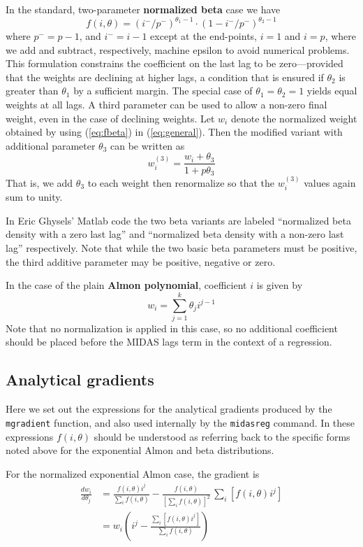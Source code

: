 \documentclass{article}
\begin{document}
In the standard, two-parameter \textbf{normalized beta} case we have
\begin{equation}
\label{eq:fbeta}
  f(i, \theta) = (i^-/p^-)^{\theta_1-1} \cdot (1-i^-/p^-)^{\theta_2-1}
\end{equation}
where $p^- = p-1$, and $i^- = i-1$ except at the end-points, $i=1$ and
$i=p$, where we add and subtract, respectively, machine epsilon to
avoid numerical problems.  This formulation constrains the coefficient
on the last lag to be zero---provided that the weights are declining
at higher lags, a condition that is ensured if $\theta_2$ is greater
than $\theta_1$ by a sufficient margin. The special case of
$\theta_1 = \theta_2 = 1$ yields equal weights at all lags. A third
parameter can be used to allow a non-zero final weight, even in the
case of declining weights.  Let $w_i$ denote the normalized weight
obtained by using (\ref{eq:fbeta}) in (\ref{eq:general}). Then the
modified variant with additional parameter $\theta_3$ can be written
as
\[
w^{(3)}_i = \frac{w_i + \theta_3}{1 + p\theta_3}
\]
That is, we add $\theta_3$ to each weight then renormalize so that the
$w^{(3)}_i$ values again sum to unity.

In Eric Ghysels' Matlab code the two beta variants are labeled
``normalized beta density with a zero last lag'' and ``normalized beta
density with a non-zero last lag'' respectively.  Note that while the
two basic beta parameters must be positive, the third additive
parameter may be positive, negative or zero.

\vspace{1ex}

In the case of the plain \textbf{Almon polynomial}, coefficient $i$
is given by
\[
w_i = \sum_{j=1}^k \theta_j i^{j-1}
\]
Note that no normalization is applied in this case, so no additional
coefficient should be placed before the MIDAS lags term in the context
of a regression.

\subsection*{Analytical gradients}

Here we set out the expressions for the analytical gradients produced
by the \texttt{mgradient} function, and also used internally by the
\texttt{midasreg} command. In these expressions $f(i,\theta)$ should
be understood as referring back to the specific forms noted above
for the exponential Almon and beta distributions. 

For the normalized exponential Almon case, the gradient is
\begin{align*}
\frac{dw_i}{d\theta_j} &= 
\frac{f(i, \theta) i^j}{\sum_if(i, \theta)} - 
\frac{f(i, \theta)}{\left[\sum_if(i, \theta)\right]^2}
\, \sum_i\left[f(i, \theta) i^j\right] \\[4pt]
 &= w_i \left(i^j - 
\frac{\sum_i\left[f(i,\theta)i^j\right]}{\sum_i f(i, \theta)}\right)
\end{align*}
\end{document}
